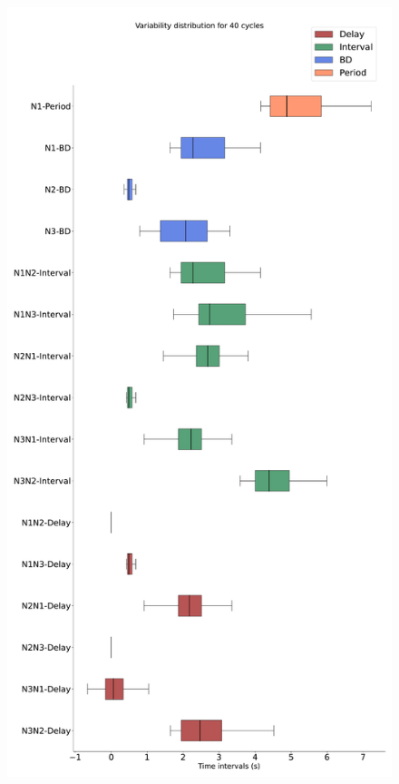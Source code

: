 \begin{figure}[htbp]
\begin{minipage}[b]{0.45\textwidth}
		\includegraphics[width=\textwidth]{./invariants/data/SUSSEX/CV1a_driven4/images/stim_cv1a4_3phases_boxplot.pdf}
	\end{minipage}
	\begin{minipage}[b]{0.53\textwidth}

\end{minipage}
\end{figure}
